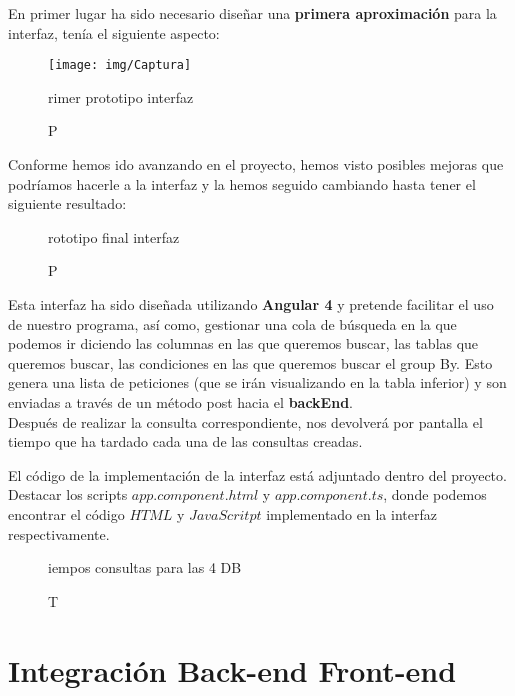 \documentclass[12pt,a4paper]{article}
\begin{document}
En primer lugar ha sido necesario diseñar una \textbf{primera aproximación} para la interfaz, tenía el siguiente aspecto:

\begin{figure}[!h]
\centering
\texttt{[image: img/Captura]}
\label{int1}
\caption Primer prototipo interfaz
\end{figure}


Conforme hemos ido avanzando en el proyecto, hemos visto posibles mejoras que podríamos hacerle a la interfaz y la hemos seguido cambiando hasta tener el siguiente resultado:

\begin{figure}[!h]
\centering
{}
\caption Prototipo final interfaz
\label{int2}
\end{figure}

Esta interfaz ha sido diseñada utilizando \textbf{Angular 4} y pretende facilitar el uso de nuestro programa, así como, gestionar una cola de búsqueda en la que podemos ir diciendo las columnas en las que queremos buscar, las tablas que queremos buscar, las condiciones en las que queremos buscar el group By. Esto genera una lista de peticiones (que se irán visualizando en la tabla inferior) y son enviadas a través de un método post hacia el \textbf{backEnd}. \\

Después de realizar la consulta correspondiente, nos devolverá por pantalla el tiempo que ha tardado cada una de las consultas creadas.

El código de la implementación de la interfaz está adjuntado dentro del proyecto. Destacar los scripts $app.component.html$ y $app.component.ts$, donde podemos encontrar el código $HTML$ y $JavaScritpt$ implementado en la interfaz respectivamente.\\

\begin{figure}[!h]
\centering
{}
\caption Tiempos consultas para las 4 DB
\label{int3}
\end{figure}


\newpage
\mbox{}
\newpage

\section{Integración Back-end Front-end} \label{pto8}
\end{document}
